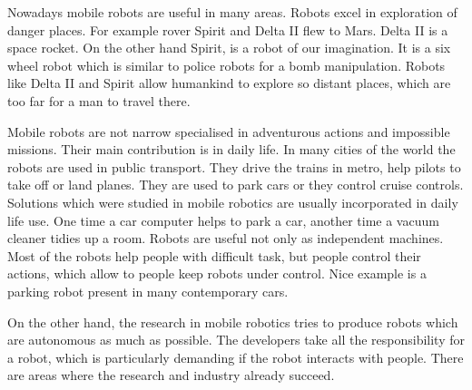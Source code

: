   Nowadays mobile robots are useful in many areas. Robots excel in exploration of danger places. 
  For example rover Spirit and Delta II flew to Mars.
  Delta II is a space rocket. On the other hand Spirit, is a robot of our imagination. It is a six wheel robot
  which is similar to police robots for a bomb manipulation.
  Robots like Delta II and Spirit allow humankind to explore so distant places, which are too far for a man to travel there.
  
  Mobile robots are not narrow specialised in adventurous actions and impossible missions. 
  Their main contribution is in daily life.
  In many cities of the world the robots are used in public transport. They drive the trains in metro,
  help pilots to take off or land planes. They are used to park cars or they control cruise controls.
  Solutions which were studied in mobile robotics are usually incorporated in daily life use. 
  One time a car computer helps to park a car,
  another time a vacuum cleaner tidies up a room.
  Robots are useful not only as independent machines. Most of the robots help people with difficult task, 
  but people control their actions, which allow to people keep robots under control.
  Nice example is a parking robot present in many contemporary cars.
  
  
  On the other hand, the research in mobile robotics tries to produce robots which are autonomous as much as possible.
  The developers take all the responsibility for a robot, which is particularly demanding if the robot interacts with people. 
  There are areas where the research and industry already succeed.
  
